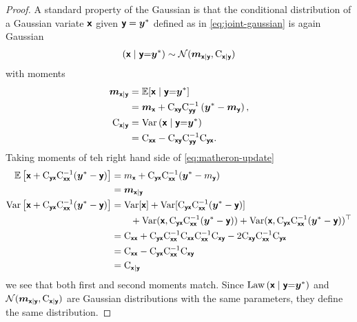 \documentclass{article}
\begin{document}
\begin{proof}
    A standard property of the Gaussian \citep[e.g.][]{Petersen2012Matrix} is that the conditional distribution of a Gaussian variate  $\vrv{x}$ given $\vrv{y} = \vv{y}^*$ defined as in \eqref{eq:joint-gaussian} is again Gaussian
    \begin{align}
        \left(\vrv{x} \gvn \vrv{y} {=} \vv{y}^*\right)
        \sim\Normal(\vv{m}_{\vrv{x}|\vrv{y}}, \mm{C}_{\vrv{x}|\vrv{y}})
    \end{align}
    with moments
    \begin{align}
        \vv{m}_{\vrv{x}|\vrv{y}}
            &=\Ex [\vrv{x} \gvn \vrv{y} {=} \vv{y}^*]\\
            &= \vv{m}_{\vrv{x}} + \mm{C}_{\vrv{xy}} \mm{C}_{\vrv{yy}}^{-1} \left( \vv{y}^* - \vv{m}_{\vrv{y}} \right), \\
        \mm{C}_{\vrv{x}|\vrv{y}}
            &= \var \left(\vrv{x} \gvn \vrv{y} {=} \vv{y}^*\right)\\
            &= \mm{C}_{\vrv{xx}} - \mm{C}_{\vrv{xy}} \mm{C}_{\vrv{yy}}^{-1} \mm{C}_{\vrv{yx}}.
    \end{align}
Taking moments of teh right hand side of \eqref{eq:matheron-update}
\begin{align}
\Ex\left[\vrv{x}+\mm{C}_{\vrv{yx}} \mm{C}_{\vrv{xx}}^{-1}(\vv{y}^*-\vrv{y})\right]
&=m_{\vrv{x}} +\mm{C}_{\vrv{yx}}\mm{C}_{\vrv{xx}}^{-1}(\vv{y}^*-m_{\vrv{y}})\\
&=\vv{m}_{\vrv{x}|\vrv{y}}\\
\var\left[\vrv{x}+\mm{C}_{\vrv{yx}} \mm{C}_{\vrv{xx}}^{-1}(\vv{y}^*-\vrv{y})\right]
&=
    \var[\vrv{x}]+\var[\mm{C}_{\vrv{yx}} \mm{C}_{\vrv{xx}}^{-1}(\vv{y}^*-\vrv{y})] \notag \\
    &\hspace{2em} +\var(\vrv{x},\mm{C}_{\vrv{yx}} \mm{C}_{\vrv{xx}}^{-1}(\vv{y}^*-\vrv{y}))
    +\var(\vrv{x},\mm{C}_{\vrv{yx}} \mm{C}_{\vrv{xx}}^{-1}(\vv{y}^*-\vrv{y}))^{\top}\\
&=\mm{C}_{\vrv{x}\vrv{x}} +\mm{C}_{\vrv{yx}} \mm{C}_{\vrv{xx}}^{-1}\mm{C}_{\vrv{xx}} \mm{C}_{\vrv{xx}}^{-1}\mm{C}_{\vrv{xy}}
-  2\mm{C}_{\vrv{xy}} \mm{C}_{\vrv{xx}}^{-1}\mm{C}_{\vrv{yx}}\\
&=\mm{C}_{\vrv{x}\vrv{x}} -\mm{C}_{\vrv{yx}} \mm{C}_{\vrv{xx}}^{-1}\mm{C}_{\vrv{xy}}\\
&=\mm{C}_{\vrv{x}|\vrv{y}}
\end{align}
we see that both first and second moments match.
Since $\Law\left(\vrv{x} \gvn \vrv{y} {=} \vv{y}^*\right)$ and
$\Normal(\vv{m}_{\vrv{x}|\vrv{y}}, \mm{C}_{\vrv{x}|\vrv{y}})$ are Gaussian distributions with the same parameters, they define the same distribution.
\end{proof}
\end{document}
